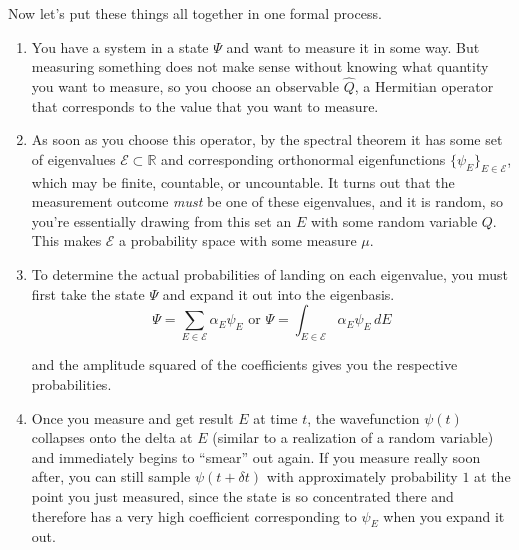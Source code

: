 \documentclass{article}
\begin{document}
  Now let's put these things all together in one formal process. 
  \begin{enumerate} 
    \item You have a system in a state $\Psi$ and want to measure it in some way. But measuring something does not make sense without knowing what quantity you want to measure, so you choose an observable $\hat{Q}$, a Hermitian operator that corresponds to the value that you want to measure. 

    \item As soon as you choose this operator, by the spectral theorem it has some set of eigenvalues $\mathcal{E} \subset \mathbb{R}$ and corresponding orthonormal eigenfunctions $\{\psi_E\}_{E \in \mathcal{E}}$, which may be finite, countable, or uncountable. It turns out that the measurement outcome \textit{must} be one of these eigenvalues, and it is random, so you're essentially drawing from this set an $E$ with some random variable $Q$. This makes $\mathcal{E}$ a probability space with some measure $\mu$.

    \item To determine the actual probabilities of landing on each eigenvalue, you must first take the state $\Psi$ and expand it out into the eigenbasis. 
      \begin{equation} 
        \Psi = \sum_{E \in \mathcal{E}} \alpha_E \psi_E \text{ or } \Psi = \int_{E \in \mathcal{E}} \alpha_E \psi_E \,dE 
      \end{equation}

    and the amplitude squared of the coefficients gives you the respective probabilities. 

    \item Once you measure and get result $E$ at time $t$, the wavefunction  $\psi(t)$ collapses onto the delta at $E$ (similar to a realization of a random variable) and immediately begins to ``smear'' out again. If you measure really soon after, you can still sample $\psi(t + \delta t)$ with approximately probability $1$ at the point you just measured, since the state is so concentrated there and therefore has a very high coefficient corresponding to $\psi_E$ when you expand it out. 
  \end{enumerate}
\end{document}
